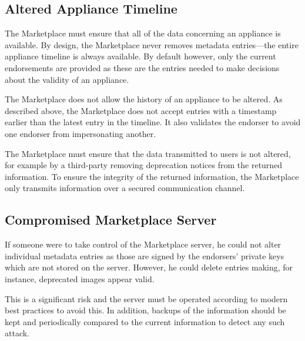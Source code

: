 \subsection{Altered Appliance Timeline}

The Marketplace must ensure that all of the data concerning an
appliance is available.  By design, the Marketplace never removes
metadata entries---the entire appliance timeline is always available.
By default however, only the current endorsements are provided as
these are the entries needed to make decisions about the validity of
an appliance.

The Marketplace does not allow the history of an appliance to be
altered.  As described above, the Marketplace does not accept entries
with a timestamp earlier than the latest entry in the timeline.  It
also validates the endorser to avoid one endorser from impersonating
another.

The Marketplace must ensure that the data transmitted to users is not
altered, for example by a third-party removing deprecation notices
from the returned information.  To ensure the integrity of the
returned information, the Marketplace only transmits information over
a secured communication channel.

\subsection{Compromised Marketplace Server}

If someone were to take control of the Marketplace server, he could
not alter individual metadata entries as those are signed by the
endorsers' private keys which are not stored on the server.  However, he
could delete entries making, for instance, deprecated images appear
valid.

This is a significant risk and the server must be operated according
to modern best practices to avoid this.  In addition, backups of the
information should be kept and periodically compared to the current
information to detect any such attack.
